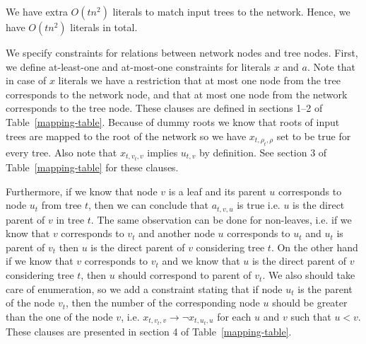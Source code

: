\documentclass[runningheads, envcountsame, a4paper]{llncs}
\begin{document}
We have extra $O(tn^2)$ literals to match input trees to the network. Hence, we have $O(tn^2)$ literals in total.

We specify constraints for relations between network nodes and tree nodes. 
First, we define at-least-one and at-most-one constraints for literals $x$ and $a$. Note that in case 
of $x$ literals we have a restriction that at most one node from the tree corresponds to the network node, and that at 
most one node from the network corresponds to the tree node. These clauses are defined in sections 1--2 of Table~\ref{mapping-table}.
Because of dummy roots we know that roots of input trees 
are mapped to the root of the network so we have $x_{t,\rho_t,\rho}$ set to be true for every tree. Also 
note that $x_{t,v_t,v}$ implies $u_{t,v}$ by definition. See section 3 of Table~\ref{mapping-table} for these clauses.

Furthermore, if we know that node $v$ is a leaf and its parent $u$ corresponds to node $u_t$ from tree $t$, 
then we can conclude that $a_{t,v,u}$ is true i.e. $u$ is the direct parent of $v$ in tree $t$. The same observation 
can be done for non-leaves, i.e. if we know that $v$ corresponds to $v_t$ and another node $u$ corresponds to $u_t$ 
and $u_t$ is parent of $v_t$ then $u$ is the direct parent of $v$ considering tree $t$. On the other hand if we know 
that $v$ corresponds to $v_t$ and we know that $u$ is the direct parent of $v$ considering tree $t$, then $u$ should 
correspond to parent of $v_t$. We also should take care of enumeration, so we add a constraint stating that if node 
$u_t$ is the parent of the node $v_t$, then the number of the corresponding node $u$ should be greater than the one of 
the node $v$, i.e. $x_{t,v_t,v} \rightarrow \neg x_{t,u_t,u}$ for each $u$ and $v$ such that $u < v$. These clauses are
presented in section 4 of Table~\ref{mapping-table}.
\end{document}
